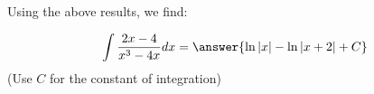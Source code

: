\documentclass{ximera}
\begin{document}
\begin{exercise}
\begin{exercise}
\begin{exercise}
\begin{exercise}
\begin{exercise}
\begin{exercise}
Using the above results, we find:

 \[
\int \frac{2x-4}{x^3-4x} dx = \answer{\ln|x|-\ln|x+2|+C}
\]
(Use $C$ for the constant of integration)


\end{exercise}
\end{exercise}
\end{exercise}
\end{exercise}
\end{exercise}
\end{exercise}
\end{document}

